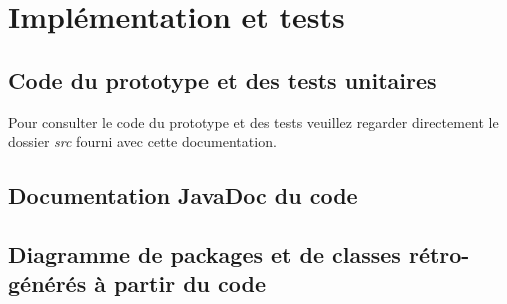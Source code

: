 \documentclass[10pt,a4paper]{book}
\begin{document}
\chapter{Implémentation et tests}
\section{Code du prototype et des tests unitaires}
Pour consulter le code du prototype et des tests veuillez regarder directement le dossier \textit{src} fourni avec cette documentation.
\section{Documentation JavaDoc du code}
\section{Diagramme de packages et de classes rétro-générés à partir du code}
\end{document}
